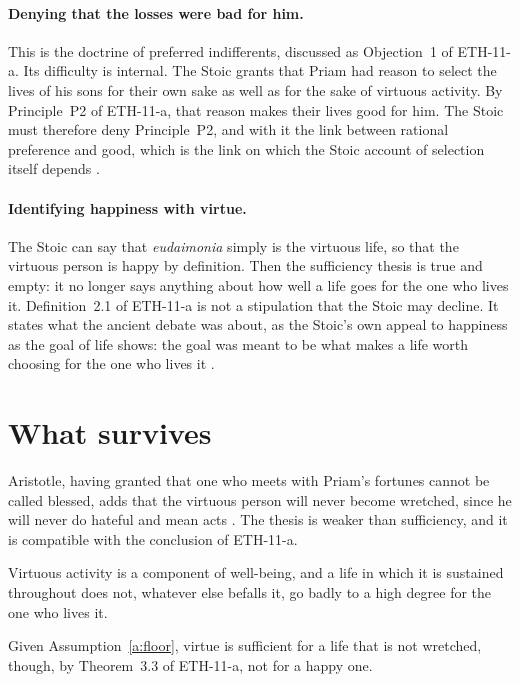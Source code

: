 \documentclass{situationist-preprint}
\begin{document}
\paragraph{Denying that the losses were bad for him.} This is the doctrine of preferred indifferents, discussed as Objection~1 of ETH-11-a. Its difficulty is internal. The Stoic grants that Priam had reason to select the lives of his sons for their own sake as well as for the sake of virtuous activity. By Principle~P2 of ETH-11-a, that reason makes their lives good for him. The Stoic must therefore deny Principle~P2, and with it the link between rational preference and good, which is the link on which the Stoic account of selection itself depends \citep{Annas1993}.

\paragraph{Identifying happiness with virtue.} The Stoic can say that \emph{eudaimonia} simply is the virtuous life, so that the virtuous person is happy by definition. Then the sufficiency thesis is true and empty: it no longer says anything about how well a life goes for the one who lives it. Definition~2.1 of ETH-11-a is not a stipulation that the Stoic may decline. It states what the ancient debate was about, as the Stoic's own appeal to happiness as the goal of life shows: the goal was meant to be what makes a life worth choosing for the one who lives it \citep[V]{CiceroTusc}.

\section{What survives}

Aristotle, having granted that one who meets with Priam's fortunes cannot be called blessed, adds that the virtuous person will never become wretched, since he will never do hateful and mean acts \citep[I.10, 1100b33--1101a8]{AristotleNE}. The thesis is weaker than sufficiency, and it is compatible with the conclusion of ETH-11-a.

\begin{assumption}[Floor]\label{a:floor}
Virtuous activity is a component of well-being, and a life in which it is sustained throughout does not, whatever else befalls it, go badly to a high degree for the one who lives it.
\end{assumption}

\begin{proposition}\label{p:floor}
Given Assumption~\ref{a:floor}, virtue is sufficient for a life that is not wretched, though, by Theorem~3.3 of ETH-11-a, not for a happy one.
\end{proposition}
\end{document}
